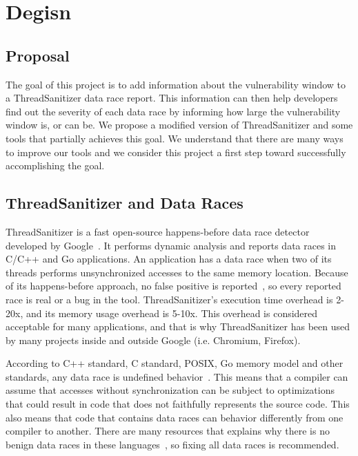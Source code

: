 \documentclass{acm_proc_article-sp}
\begin{document}
\section{Degisn}
\subsection{Proposal}
The goal of this project is to add information about the vulnerability window to a ThreadSanitizer data race report. This information can then help developers find out the severity of each data race by informing how large the vulnerability window is, or can be. We propose a modified version of ThreadSanitizer and some tools that partially achieves this goal. We understand that there are many ways to improve our tools and we consider this project a first step toward successfully accomplishing the goal.

\subsection{ThreadSanitizer and Data Races}

ThreadSanitizer is a fast open-source happens-before data race detector developed by Google~\cite{serebryany2009threadsanitizer}. It performs dynamic analysis and reports data races in C/C++ and Go applications. An application has a data race when two of its threads performs unsynchronized accesses to the same memory location. Because of its happens-before approach, no false positive is reported~\cite{serebryany2009threadsanitizer}, so every reported race is real or a bug in the tool. ThreadSanitizer's execution time overhead is 2-20x, and its memory usage overhead is 5-10x. This overhead is considered acceptable for many applications, and that is why ThreadSanitizer has been used by many projects inside and outside Google (i.e. Chromium, Firefox).

According to C++ standard, C standard, POSIX, Go memory model and other standards, any data race is undefined behavior~\cite{intelBenignRaceWebsite}. This means that a compiler can assume that accesses without synchronization can be subject to optimizations that could result in code that does not faithfully represents the source code. This also means that code that contains data races can behavior differently from one compiler to another. There are many resources that explains why there is no benign data races in these languages~\cite{aboutRacesWebsite,intelBenignRaceWebsite,boehm2011miscompile,doubleCheckingLockingWebsite}, so fixing all data races is recommended. 
\end{document}
